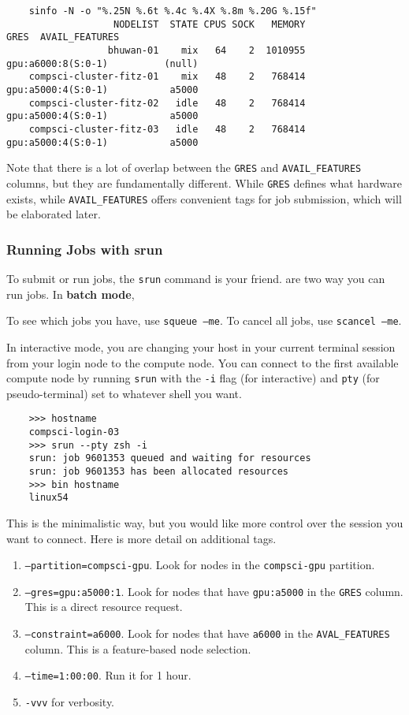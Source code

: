   \begin{lstlisting}
    sinfo -N -o "%.25N %.6t %.4c %.4X %.8m %.20G %.15f"
                   NODELIST  STATE CPUS SOCK   MEMORY                 GRES  AVAIL_FEATURES
                  bhuwan-01    mix   64    2  1010955   gpu:a6000:8(S:0-1)          (null)
    compsci-cluster-fitz-01    mix   48    2   768414   gpu:a5000:4(S:0-1)           a5000
    compsci-cluster-fitz-02   idle   48    2   768414   gpu:a5000:4(S:0-1)           a5000
    compsci-cluster-fitz-03   idle   48    2   768414   gpu:a5000:4(S:0-1)           a5000 
  \end{lstlisting}

  Note that there is a lot of overlap between the \texttt{GRES} and \texttt{AVAIL\_FEATURES} columns, but they are fundamentally different. While \texttt{GRES} defines what hardware exists, while \texttt{AVAIL\_FEATURES} offers convenient tags for job submission, which will be elaborated later. 

\subsubsection{Running Jobs with srun}

  To submit or run jobs, the \texttt{srun} command is your friend. are two way you can run jobs. In \textbf{batch mode}, 

  To see which jobs you have, use \texttt{squeue --me}. To cancel all jobs, use \texttt{scancel --me}. 

  In interactive mode, you are changing your host in your current terminal session from your login node to the compute node. You can connect to the first available compute node by running \texttt{srun} with the \texttt{-i} flag (for interactive) and \texttt{pty} (for pseudo-terminal) set to whatever shell you want. 

  \begin{lstlisting}
    >>> hostname 
    compsci-login-03
    >>> srun --pty zsh -i 
    srun: job 9601353 queued and waiting for resources
    srun: job 9601353 has been allocated resources
    >>> bin hostname
    linux54
  \end{lstlisting}

  This is the minimalistic way, but you would like more control over the session you want to connect. Here is more detail on additional tags. 
  \begin{enumerate}
    \item \texttt{--partition=compsci-gpu}. Look for nodes in the \texttt{compsci-gpu} partition. 
    \item \texttt{--gres=gpu:a5000:1}. Look for nodes that have \texttt{gpu:a5000} in the \texttt{GRES} column. This is a direct resource request. 
    \item \texttt{--constraint=a6000}. Look for nodes that have \texttt{a6000} in the \texttt{AVAL\_FEATURES} column. This is a feature-based node selection. 
    \item \texttt{--time=1:00:00}. Run it for 1 hour.  
    \item \texttt{-vvv} for verbosity. 
  \end{enumerate} 

